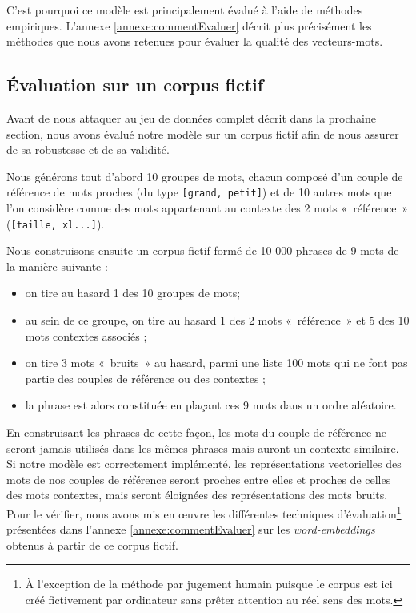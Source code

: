 \documentclass[11pt,french,french]{article}
\providecommand{\tightlist}{%
  \setlength{\parskip}{0pt}
  }
\let\rmarkdownfootnote\footnote%
\def\footnote{\protect\rmarkdownfootnote}
\begin{document}
C'est pourquoi ce modèle est principalement évalué à l'aide de méthodes
empiriques. L'annexe \ref{annexe:commentEvaluer} décrit plus précisément
les méthodes que nous avons retenues pour évaluer la qualité des
vecteurs-mots.

\subsection{Évaluation sur un corpus fictif}\label{sec:corpusFictif}

Avant de nous attaquer au jeu de données complet décrit dans la
prochaine section, nous avons évalué notre modèle sur un corpus fictif
afin de nous assurer de sa robustesse et de sa validité.

Nous générons tout d'abord 10 groupes de mots, chacun composé d'un
couple de référence de mots proches (du type
\texttt{{[}grand,\ petit{]}}) et de 10 autres mots que l'on considère
comme des mots appartenant au contexte des 2 mots «~référence~»
(\texttt{{[}taille,\ xl...{]}}).

Nous construisons ensuite un corpus fictif formé de 10 000 phrases de 9
mots de la manière suivante :

\begin{itemize}
\tightlist
\item
  on tire au hasard 1 des 10 groupes de mots;
\item
  au sein de ce groupe, on tire au hasard 1 des 2 mots «~référence~» et
  5 des 10 mots contextes associés ;
\item
  on tire 3 mots «~bruits~» au hasard, parmi une liste 100 mots qui ne
  font pas partie des couples de référence ou des contextes ;
\item
  la phrase est alors constituée en plaçant ces 9 mots dans un ordre
  aléatoire.
\end{itemize}

En construisant les phrases de cette façon, les mots du couple de
référence ne seront jamais utilisés dans les mêmes phrases mais auront
un contexte similaire. Si notre modèle est correctement implémenté, les
représentations vectorielles des mots de nos couples de référence seront
proches entre elles et proches de celles des mots contextes, mais seront
éloignées des représentations des mots bruits. Pour le vérifier, nous
avons mis en œuvre les différentes techniques d'évaluation\footnote{À
  l'exception de la méthode par \og jugement humain \fg{} puisque le
  corpus est ici créé fictivement par ordinateur sans prêter attention
  au réel sens des mots.} présentées dans l'annexe
\ref{annexe:commentEvaluer} sur les \emph{word-embeddings} obtenus à
partir de ce corpus fictif.
\end{document}
